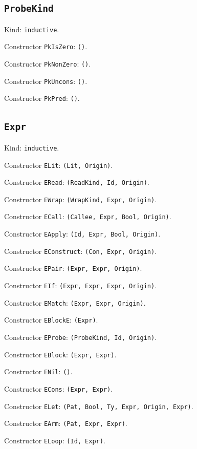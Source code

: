 \documentclass[11pt]{article}
\begin{document}
\subsection*{\texttt{ProbeKind}}
\noindent Kind: \texttt{inductive}.\par
\noindent Constructor \texttt{PkIsZero}: \texttt{()}.\par
\noindent Constructor \texttt{PkNonZero}: \texttt{()}.\par
\noindent Constructor \texttt{PkUncons}: \texttt{()}.\par
\noindent Constructor \texttt{PkPred}: \texttt{()}.\par
\subsection*{\texttt{Expr}}
\noindent Kind: \texttt{inductive}.\par
\noindent Constructor \texttt{ELit}: \texttt{(Lit, Origin)}.\par
\noindent Constructor \texttt{ERead}: \texttt{(ReadKind, Id, Origin)}.\par
\noindent Constructor \texttt{EWrap}: \texttt{(WrapKind, Expr, Origin)}.\par
\noindent Constructor \texttt{ECall}: \texttt{(Callee, Expr, Bool, Origin)}.\par
\noindent Constructor \texttt{EApply}: \texttt{(Id, Expr, Bool, Origin)}.\par
\noindent Constructor \texttt{EConstruct}: \texttt{(Con, Expr, Origin)}.\par
\noindent Constructor \texttt{EPair}: \texttt{(Expr, Expr, Origin)}.\par
\noindent Constructor \texttt{EIf}: \texttt{(Expr, Expr, Expr, Origin)}.\par
\noindent Constructor \texttt{EMatch}: \texttt{(Expr, Expr, Origin)}.\par
\noindent Constructor \texttt{EBlockE}: \texttt{(Expr)}.\par
\noindent Constructor \texttt{EProbe}: \texttt{(ProbeKind, Id, Origin)}.\par
\noindent Constructor \texttt{EBlock}: \texttt{(Expr, Expr)}.\par
\noindent Constructor \texttt{ENil}: \texttt{()}.\par
\noindent Constructor \texttt{ECons}: \texttt{(Expr, Expr)}.\par
\noindent Constructor \texttt{ELet}: \texttt{(Pat, Bool, Ty, Expr, Origin, Expr)}.\par
\noindent Constructor \texttt{EArm}: \texttt{(Pat, Expr, Expr)}.\par
\noindent Constructor \texttt{ELoop}: \texttt{(Id, Expr)}.\par
\end{document}
